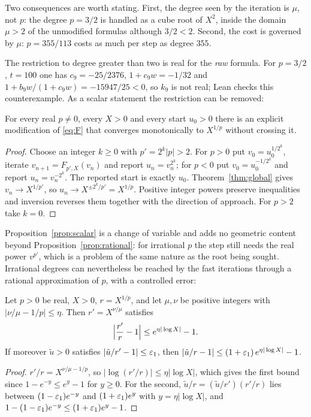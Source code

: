 Two consequences are worth stating. First, the degree seen by the iteration is $\mu$, not $p$: the
degree $p=3/2$ is handled as a cube root of $X^{2}$, inside the domain $\mu>2$ of the unmodified
formulas although $3/2<2$. Second, the cost is governed by $\mu$: $p=355/113$ costs as much per step
as degree $355$.

The restriction to degree greater than two is real for the \emph{raw} formula. For $p=3/2$, $t=100$ one
has $c_9=-25/2376$, $1+c_9w=-1/32$ and $1+b_9w/(1+c_9w)=-15947/25<0$, so $k_9$ is not real; Lean checks
this counterexample. As a scalar statement the restriction can be removed:

\begin{proposition}\label{prop:scalar}
For every real $p\neq0$, every $X>0$ and every start $u_0>0$ there is an explicit modification of
\eqref{eq:F} that converges monotonically to $X^{1/p}$ without crossing it.
\end{proposition}
\begin{proof}
Choose an integer $k\ge0$ with $p'=2^{k}|p|>2$. For $p>0$ put $v_0=u_0^{1/2^{k}}$, iterate
$v_{n+1}=F_{p',X}(v_n)$ and report $u_n=v_n^{2^{k}}$; for $p<0$ put $v_0=u_0^{-1/2^{k}}$ and report
$u_n=v_n^{-2^{k}}$. The reported start is exactly $u_0$. Theorem~\ref{thm:global} gives
$v_n\to X^{1/p'}$, so $u_n\to X^{\pm2^{k}/p'}=X^{1/p}$. Positive integer powers preserve inequalities
and inversion reverses them together with the direction of approach. For $p>2$ take $k=0$.
\end{proof}

Proposition~\ref{prop:scalar} is a change of variable and adds no geometric content beyond
Proposition~\ref{prop:rational}: for irrational $p$ the step still needs the real power
$v^{p'}$, which is a problem of the same nature as the root being sought. Irrational degrees can
nevertheless be reached by the fast iterations through a rational approximation of $p$, with a
controlled error:

\begin{proposition}\label{prop:irrational}
Let $p>0$ be real, $X>0$, $r=X^{1/p}$, and let $\mu,\nu$ be positive integers with
$\bigl|\nu/\mu-1/p\bigr|\le\eta$. Then $r'=X^{\nu/\mu}$ satisfies
\[ \Bigl|\frac{r'}{r}-1\Bigr|\le e^{\eta|\log X|}-1 . \]
If moreover $\tilde u>0$ satisfies $|\tilde u/r'-1|\le\varepsilon_1$, then
$|\tilde u/r-1|\le(1+\varepsilon_1)\,e^{\eta|\log X|}-1$.
\end{proposition}
\begin{proof}
$r'/r=X^{\nu/\mu-1/p}$, so $|\log(r'/r)|\le\eta|\log X|$, which gives the first bound since
$1-e^{-y}\le e^{y}-1$ for $y\ge0$. For the second, $\tilde u/r=(\tilde u/r')(r'/r)$ lies between
$(1-\varepsilon_1)e^{-y}$ and $(1+\varepsilon_1)e^{y}$ with $y=\eta|\log X|$, and
$1-(1-\varepsilon_1)e^{-y}\le(1+\varepsilon_1)e^{y}-1$.
\end{proof}

